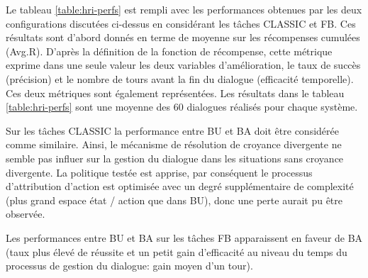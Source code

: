 \documentclass[a4paper,11pt,twoside]{StyleThese}
\begin{document}
Le tableau \ref{table:hri-perfs} est rempli avec les performances obtenues par les deux configurations discutées ci-dessus en considérant les tâches CLASSIC et FB. Ces résultats sont d'abord donnés en terme de moyenne sur les récompenses cumulées (Avg.R). D'après la définition de la fonction de récompense, cette métrique exprime dans une seule valeur les deux variables d'amélioration, le taux de succès (précision) et le nombre de tours avant la fin du dialogue (efficacité temporelle). Ces deux métriques sont également représentées. Les résultats dans le tableau \ref{table:hri-perfs} sont une moyenne des $60$ dialogues réalisés pour chaque système.



Sur les tâches CLASSIC la performance entre BU et BA doit être considérée comme similaire. Ainsi, le mécanisme de résolution de croyance divergente ne semble pas influer sur la gestion du dialogue dans les situations sans croyance divergente.  La politique testée est apprise, par conséquent le processus d'attribution d'action est optimisée avec un degré supplémentaire de complexité (plus grand espace état / action que dans BU), donc une perte aurait pu être observée.

Les performances entre BU et BA sur les tâches FB apparaissent en faveur de BA (taux plus élevé de réussite et un petit gain d'efficacité au niveau du temps  du processus de gestion du dialogue: gain moyen d'un tour).
%

\end{document}
